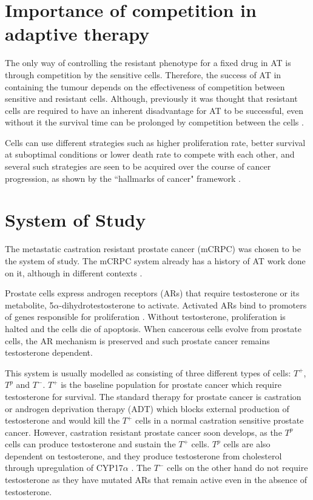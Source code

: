\section{Importance of competition in adaptive therapy}
The only way of controlling the resistant phenotype for a fixed drug in AT is through competition by the sensitive cells. Therefore, the success of AT in containing the tumour depends on the effectiveness of competition between sensitive and resistant cells. Although, previously it was thought that resistant cells are required to have an inherent disadvantage for AT to be successful, even without it the survival time can be prolonged by competition between the cells \cite{Strobl}.

Cells can use different strategies such as higher proliferation rate, better survival at suboptimal conditions or lower death rate to compete with each other, and several such strategies are seen to be acquired over the course of cancer progression, as shown by the ``hallmarks of cancer" framework \cite{Hanahan}.

\section{System of Study}
The metastatic castration resistant prostate cancer (mCRPC) was chosen to be the system of study. The mCRPC system already has a history of AT work done on it, although in different contexts \cite{Cunningham,Zhang}.

Prostate cells express androgen receptors (ARs) that require testosterone or its metabolite, 5$\alpha$-dihydrotestosterone to activate. Activated ARs bind to promoters of genes responsible for proliferation \cite{Heinlein}. Without testosterone, proliferation is halted and the cells die of apoptosis. When cancerous cells evolve from prostate cells, the AR mechanism is preserved and such prostate cancer remains testosterone dependent.

This system is usually modelled as consisting of three different types of cells: $T^+$, $T^p$ and $T^-$. $T^+$ is the baseline population for prostate cancer which require testosterone for survival. The standard therapy for prostate cancer is castration or androgen deprivation therapy (ADT) which blocks external production of testosterone and would kill the $T^+$ cells in a normal castration sensitive prostate cancer. However, castration resistant prostate cancer soon develops, as the $T^p$ cells can produce testosterone and sustain the $T^+$ cells. $T^p$ cells are also dependent on testosterone, and they produce testosterone from cholesterol through upregulation of CYP17$\alpha$ \cite{Dillard}. The $T^-$ cells on the other hand do not require testosterone as they have mutated ARs that remain active even in the absence of testosterone.

